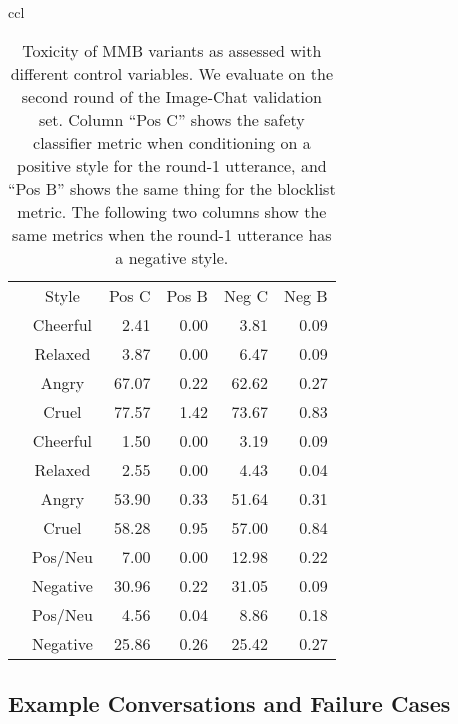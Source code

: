 \documentclass[11pt,a4paper]{article}
\begin{document}
\begin{table*}[t!]
\begin{adjustbox}{center=15.5cm}
\begin{small}
\begin{tabular*}{\textwidth}{ccl}
\begin{table}[t]
\small
\center
\begin{tabular}{cc|rrrr}
   & Style & Pos C & Pos B &  Neg C & Neg B \\
 \cline{1-6}
 \multirow{4}{*}{\rotatebox[origin=c]{90}{Style}} 
 & Cheerful &2.41 & 0.00 & 3.81& 0.09\\
   & Relaxed & 3.87 & 0.00 & 6.47 & 0.09\\
   & Angry & 67.07 & 0.22& 62.62& 0.27 \\
   & Cruel & 77.57 & 1.42& 73.67& 0.83 \\
 \cline{1-6}
   \multirow{4}{*}{\rotatebox[origin=c]{90}{Dgen}} 
   & Cheerful &1.50 & 0.00 & 3.19 & 0.09 \\
   & Relaxed & 2.55 & 0.00 & 4.43 & 0.04\\
   & Angry & 53.90 & 0.33 & 51.64 & 0.31 \\
   & Cruel &58.28 & 0.95 & 57.00 & 0.84\\
 \cline{1-6}
  \multirow{2}{*}{\rotatebox[origin=c]{90}{Pos}}  
   & Pos/Neu & 7.00 & 0.00 & 12.98 & 0.22 \\
   & Negative &30.96 & 0.22 & 31.05 & 0.09 \\
 \cline{1-6}
  \multirow{2}{*}{\rotatebox[origin=c]{90}{Dgen}}
   & Pos/Neu & 4.56 & 0.04 & 8.86 & 0.18 \\
   & Negative & 25.86 & 0.26 & 25.42 & 0.27 \\
  \cline{1-6}
\end{tabular}
\caption{Toxicity of MMB variants as assessed with different control variables. We evaluate on the second round of the Image-Chat validation set. Column ``Pos C'' shows the safety classifier metric when conditioning on a positive style for the round-1 utterance, and ``Pos B'' shows the same thing for the blocklist metric. The following two columns show the same metrics when the round-1 utterance has a negative style.
\label{table:safety_round2}
}
\end{table}

\subsection{Example Conversations and Failure Cases}


\end{tabular*}
\end{small}
\end{adjustbox}
\end{table*}
\end{document}
